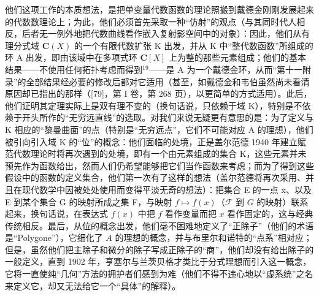 他们这项工作的本质想法，是把单变量代数函数的理论照搬到戴德金刚刚发展起来的代数数理论上；为此，他们必须首先采取一种“仿射”的观点（与其同时代人相反，后者无一例外地把代数曲线看作嵌入复射影空间中的对象）：因此，他们从有理分式域 \(\mathbf{C}(X)\) 的一个有限代数扩张 K 出发，并从 K 中“整代数函数”所组成的环 A 出发，即由该域中在多项式环 \(\mathbf{C}[X]\) 上为整的那些元素组成；他们的基本结果——不使用任何拓扑考虑而得到\(^{19}\)——是 A 为一个戴德金环，从而“第十一附录”的全部结果经必要的修改后都对它适用（甚至，如戴德金和韦伯虽然尚未看清原因却已指出的那样（{[}79{]}，第 I 卷，第 268 页），以更简单的方式适用）。此后，他们证明其定理实际上是双有理不变的（换句话说，只依赖于域 K），特别是不依赖于开头所作的“无穷远直线”的选取。对我们来说无疑更有意思的是：为了定义与 K 相应的“黎曼曲面”的点（特别是“无穷远点”，它们不可能对应 A 的理想），他们被引向引入域 K 的“位”的概念：他们面临的处境，正是盖尔范德 1940 年建立赋范代数理论时将再次遇到的处境，即有一个由元素组成的集合 K，这些元素并未预先作为函数给出，然而人们仍希望能够把它们当作函数来考虑；而为了得到这些假设中的函数的定义集合，他们第一次有了这样的想法（盖尔范德将再次采用、并且在现代数学中因被处处使用而变得平淡无奇的想法）：把集合 E 的一点 x、以及 E 到某个集合 G 的映射所成之集 F，与映射 \(f \mapsto f(x)\)（\(\mathcal{F}\) 到 \(G\) 的映射）联系起来，换句话说，在表达式 \(f(x)\) 中把 \(f\) 看作变量而把 \(x\) 看作固定的，这与经典传统相反。最后，从位的概念出发，他们毫不困难地定义了“正除子”（他们的术语是“Polygone”），它细化了 \(A\) 的理想的概念，并与布里尔和诺特的“点系”相对应；但是，虽然他们把主除子和微分的除子写成正除子的“商”，他们却没有给出除子的一般定义，直到 1902 年，亨塞尔与兰茨贝格才类比于分式理想而引入这一概念，它将一直使纯“几何”方法的拥护者们感到为难（他们不得不违心地以“虚系统”之名来定义它，却又无法给它一个“具体”的解释）。


